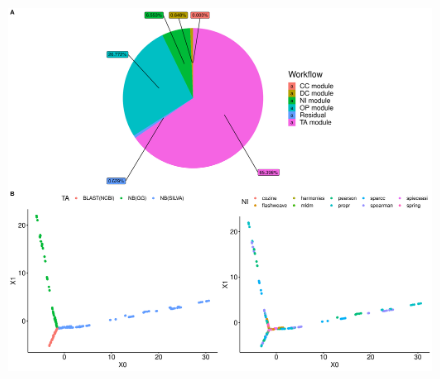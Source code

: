 \documentclass[letterpaper,12pt]{article}
\providecommand{\DIFaddbegin}{} %
\providecommand{\DIFaddend}{} %
\providecommand{\DIFdelbegin}{} %
\providecommand{\DIFaddbeginFL}{} %
\providecommand{\DIFaddendFL}{} %
\providecommand{\DIFdelbeginFL}{} %
\providecommand{\DIFdelendFL}{} %
\newcommand{\DIFscaledelfig}{0.5}
\newlength{\DIFdelgraphicswidth} %
\newlength{\DIFdelgraphicsheight} %
\newcommand{\DIFaddincludegraphics}[2][]{{\color{blue}\fbox{\DIFOincludegraphics[#1]{#2}}}} %
\newcommand{\DIFdelincludegraphics}[2][]{%
\sbox{\DIFdelgraphicsbox}{\DIFOincludegraphics[#1]{#2}}%
\settoboxwidth{\DIFdelgraphicswidth}{\DIFdelgraphicsbox} %
\settoboxtotalheight{\DIFdelgraphicsheight}{\DIFdelgraphicsbox} %
\scalebox{\DIFscaledelfig}{%
\parbox[b]{\DIFdelgraphicswidth}{\usebox{\DIFdelgraphicsbox}\\[-\baselineskip] \rule{\DIFdelgraphicswidth}{0em}}\llap{\resizebox{\DIFdelgraphicswidth}{\DIFdelgraphicsheight}{%
\setlength{\unitlength}{\DIFdelgraphicswidth}%
\begin{picture}(1,1)%
\thicklines\linethickness{2pt} %
{\color[rgb]{1,0,0}\put(0,0){\framebox(1,1){}}}%
{\color[rgb]{1,0,0}\put(0,0){\line( 1,1){1}}}%
{\color[rgb]{1,0,0}\put(0,1){\line(1,-1){1}}}%
\end{picture}%
}\hspace*{3pt}}} %
} %
\DeclareRobustCommand{\DIFaddbegin}{\DIFOaddbegin \let\includegraphics\DIFaddincludegraphics} %
\DeclareRobustCommand{\DIFaddend}{\DIFOaddend \let\includegraphics\DIFOincludegraphics} %
\DeclareRobustCommand{\DIFdelbegin}{\DIFOdelbegin \let\includegraphics\DIFdelincludegraphics} %
\DeclareRobustCommand{\DIFaddbeginFL}{\DIFOaddbeginFL \let\includegraphics\DIFaddincludegraphics} %
\DeclareRobustCommand{\DIFaddendFL}{\DIFOaddendFL \let\includegraphics\DIFOincludegraphics} %
\DeclareRobustCommand{\DIFdelbeginFL}{\DIFOdelbeginFL \let\includegraphics\DIFdelincludegraphics} %
\DeclareRobustCommand{\DIFdelendFL}{\DIFOaddendFL \let\includegraphics\DIFOincludegraphics} %
\begin{document}
\DIFaddbegin 

  \DIFaddend \FloatBarrier
  \newpage

  \DIFdelbegin %
\DIFdelendFL \DIFaddbeginFL \begin{figure}
    \DIFaddendFL \centering
    \DIFdelbeginFL %
\DIFdelendFL \DIFaddbeginFL \includegraphics[width=1.0\linewidth]{figure2.pdf}
  \DIFaddendFL \end{figure}
  \DIFdelbegin %
\end{document}
